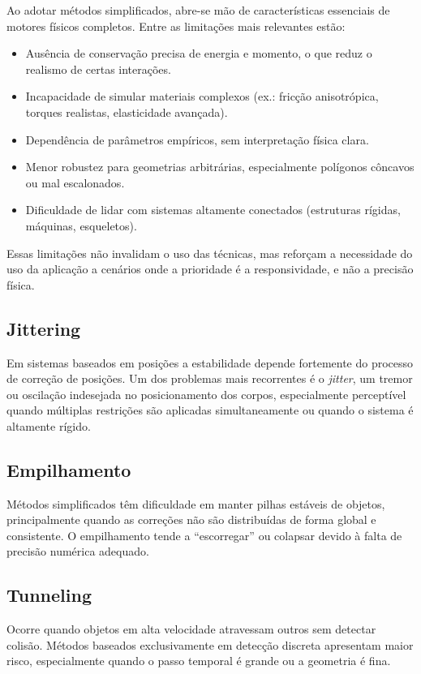Ao adotar métodos simplificados, abre-se mão de características essenciais de motores físicos completos. Entre as limitações mais relevantes estão:
\begin{itemize}
	\item Ausência de conservação precisa de energia e momento, o que reduz o realismo de certas interações.
	\item Incapacidade de simular materiais complexos (ex.: fricção anisotrópica, torques realistas, elasticidade avançada).
	\item Dependência de parâmetros empíricos, sem interpretação física clara.
	\item Menor robustez para geometrias arbitrárias, especialmente polígonos côncavos ou mal escalonados.
	\item Dificuldade de lidar com sistemas altamente conectados (estruturas rígidas, máquinas, esqueletos).
\end{itemize}
Essas limitações não invalidam o uso das técnicas, mas reforçam a necessidade do uso da aplicação a cenários onde a prioridade é a responsividade, e não a precisão física.

\subsection*{Jittering}

Em sistemas baseados em posições a estabilidade depende fortemente do processo de correção de posições. Um dos problemas mais recorrentes é o \textit{jitter}, um tremor ou oscilação indesejada no posicionamento dos corpos, especialmente perceptível quando múltiplas restrições são aplicadas simultaneamente ou quando o sistema é altamente rígido.

\subsection*{Empilhamento}

Métodos simplificados têm dificuldade em manter pilhas estáveis de objetos, principalmente quando as correções não são distribuídas de forma global e consistente. O empilhamento tende a %
``escorregar'' ou colapsar devido à falta de precisão numérica adequado.

\subsection*{Tunneling}

Ocorre quando objetos em alta velocidade atravessam outros sem detectar colisão. Métodos baseados exclusivamente em detecção discreta apresentam maior risco, especialmente quando o passo temporal é grande ou a geometria é fina.

